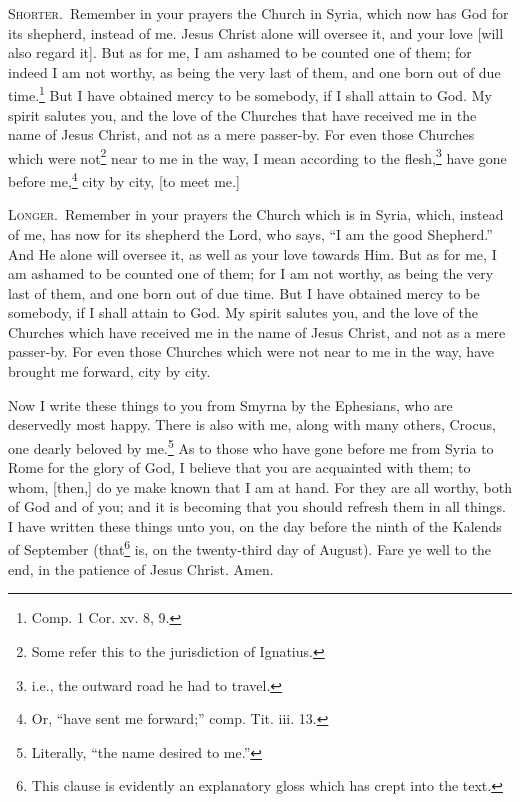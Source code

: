 
\textsc{Shorter.}~Remember in your prayers the Church in Syria, which now has God for its shepherd, instead of me. Jesus Christ alone will oversee it, and your love [will also regard it]. But as for me, I am ashamed to be counted one of them; for indeed I am not worthy, as being the very last of them, and one born out of due time.\footnote{Comp. 1 Cor. xv. 8, 9.} But I have obtained mercy to be somebody, if I shall attain to God. My spirit salutes you, and the love of the Churches that have received me in the name of Jesus Christ, and not as a mere passer-by. For even those Churches which were not\footnote{Some refer this to the jurisdiction of Ignatius.} near to me in the way, I mean according to the flesh,\footnote{i.e., the outward road he had to travel.} have gone before me,\footnote{Or, “have sent me forward;” comp. Tit. iii. 13.} city by city, [to meet me.]

\textsc{Longer.}~Remember in your prayers the Church which is in Syria, which, instead of me, has now for its shepherd the Lord, who says, “I am the good Shepherd.” And He alone will oversee it, as well as your love towards Him. But as for me, I am ashamed to be counted one of them; for I am not worthy, as being the very last of them, and one born out of due time. But I have obtained mercy to be somebody, if I shall attain to God. My spirit salutes you, and the love of the Churches which have received me in the name of Jesus Christ, and not as a mere passer-by. For even those Churches which were not near to me in the way, have brought me forward, city by city.


Now I write these things to you from Smyrna by the Ephesians, who are deservedly most happy. There is also with me, along with many others, Crocus, one dearly beloved by me.\footnote{Literally, “the name desired to me.”} As to those who have gone before me from Syria to Rome for the glory of God, I believe that you are acquainted with them; to whom, [then,] do ye make known that I am at hand. For they are all worthy, both of God and of you; and it is becoming that you should refresh them in all things. I have written these things unto you, on the day before the ninth of the Kalends of September (that\footnote{This clause is evidently an explanatory gloss which has crept into the text.} is, on the twenty-third day of August). Fare ye well to the end, in the patience of Jesus Christ. Amen.

